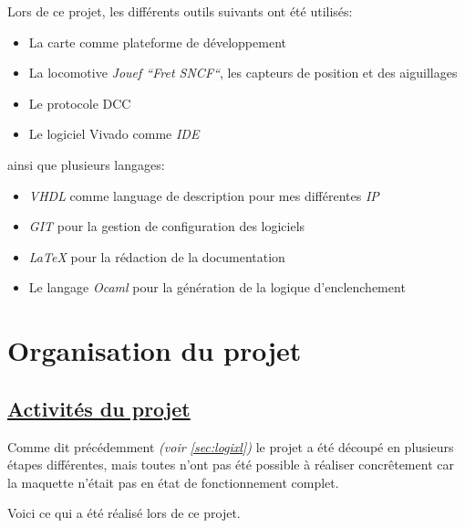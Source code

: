 Lors de ce projet, les diff\'erents outils suivants ont été utilisés:
\medskip
\begin{itemize}
  \item La carte \crt comme plateforme de d\'eveloppement
  \item La locomotive \emph{Jouef ``Fret SNCF``}\cite{Jouef}, les capteurs de
    position et des aiguillages
  \item Le protocole DCC \cite{DCC}
  \item Le logiciel Vivado comme \emph{IDE}
\end{itemize}
\medskip
ainsi que plusieurs langages:
\begin{itemize}
  \item \emph{VHDL}\cite{VHDL} comme language de description pour mes diff\'erentes
    \emph{IP}
  \item \emph{GIT}\cite{GIT} pour la gestion de configuration des logiciels
  \item \emph{\LaTeX}\cite{LATEX} pour la r\'edaction de la documentation
  \item Le langage \emph{Ocaml}\cite{OCAML} pour la g\'en\'eration de la logique d'enclenchement
\end{itemize}

\newpage
\section{Organisation du projet}
\label{sec:org_proj}

\subsection{\underline{Activit\'es du projet}}
\label{sec:activ}

Comme dit précédemment \emph{(voir \ref{sec:logixl})} le projet a \'et\'e
découp\'e en plusieurs \'etapes diff\'erentes, mais toutes n'ont pas été
possible à réaliser concrêtement car la maquette n'\'etait pas en \'etat de
fonctionnement complet.


Voici ce qui a \'et\'e r\'ealis\'e lors de ce projet.

